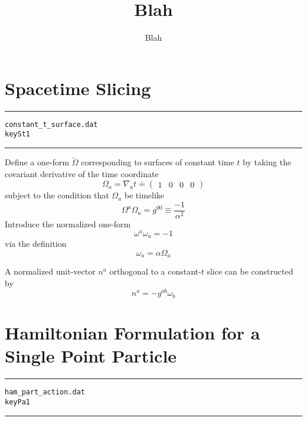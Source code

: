\documentclass[12pt]{article}
\begin{document}
\title{Blah}
\author{Blah}
\maketitle

\section{Spacetime Slicing}

\clearpage
\vspace{5mm}
\hrule
\begin{alltt}
  constant_t_surface.dat
  key St1
\end{alltt}
\hrule
\vspace{5mm}

Define a one-form $ {\tilde \Omega} $ corresponding to surfaces of constant time $t$ by
taking the covariant derivative of the time coordinate
\begin{equation}\label{St1_1}
{ \Omega } _ { a } = {\nabla}_{a} t \doteq \left( \begin{array}{cccc  } 
 1 & 0 & 0 & 0             \end{array} \right)
\end{equation}
subject to the condition that $ { \Omega } _ { a } $ be timelike
\begin{equation}\label{St1_2} \nonumber
{ \Omega } ^ { a } { \Omega } _ { a } = { g } ^ { 00 } \equiv \frac{-1}{ \alpha ^2}
\end{equation}
Introduce the normalized one-form
\begin{equation}\label{St1_3} \nonumber
{ \omega } ^ { a } { \omega } _ { a } = -1
\end{equation}
via the definition
\begin{equation}\label{St1_4} \nonumber
{ \omega } _ { a } = \alpha { \Omega } _ { a }
\end{equation}

A normalized unit-vector $ {n ^ a} $ orthogonal to a constant-$t$ slice can be
constructed by
\begin{equation}\label{St1_4} \nonumber
{n ^ a} = - {g}^{a b} { \omega } _ { b }
\end{equation}
\section{Hamiltonian Formulation for a Single Point Particle}

\clearpage
\vspace{5mm}
\hrule
\begin{alltt}
  ham_part_action.dat
  key Pa1
\end{alltt}
\hrule
\vspace{5mm}
\end{document}
